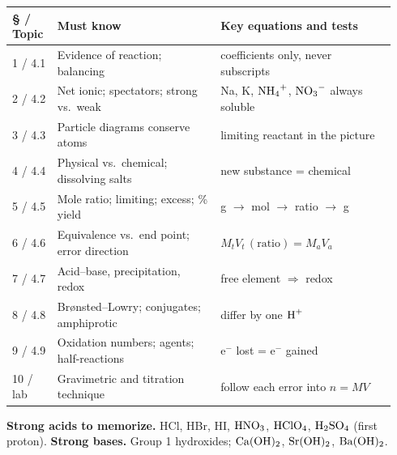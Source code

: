 \documentclass[11pt]{article}
\begin{document}
\begin{longtable}{@{}p{0.11\linewidth}p{0.40\linewidth}p{0.43\linewidth}@{}}\toprule
\S{} / Topic & Must know & Key equations and tests \\ \midrule
1 / 4.1 & Evidence of reaction; balancing & coefficients only, never subscripts \\[3pt]
2 / 4.2 & Net ionic; spectators; strong vs.\ weak & Na, K, $\ce{NH4+}$, $\ce{NO3-}$ always soluble \\[3pt]
3 / 4.3 & Particle diagrams conserve atoms & limiting reactant in the picture \\[3pt]
4 / 4.4 & Physical vs.\ chemical; dissolving salts & new substance = chemical \\[3pt]
5 / 4.5 & Mole ratio; limiting; excess; \% yield & g $\rightarrow$ mol $\rightarrow$ ratio $\rightarrow$ g \\[3pt]
6 / 4.6 & Equivalence vs.\ end point; error direction & $M_tV_t\,(\text{ratio}) = M_aV_a$ \\[3pt]
7 / 4.7 & Acid--base, precipitation, redox & free element $\Rightarrow$ redox \\[3pt]
8 / 4.8 & Brønsted--Lowry; conjugates; amphiprotic & differ by one $\ce{H+}$ \\[3pt]
9 / 4.9 & Oxidation numbers; agents; half-reactions & e$^-$ lost = e$^-$ gained \\[3pt]
10 / lab & Gravimetric and titration technique & follow each error into $n = MV$ \\ \bottomrule
\end{longtable}

\textbf{Strong acids to memorize.} HCl, HBr, HI, $\ce{HNO3}$, $\ce{HClO4}$, $\ce{H2SO4}$ (first proton). \textbf{Strong bases.} Group 1 hydroxides; $\ce{Ca(OH)2}$, $\ce{Sr(OH)2}$, $\ce{Ba(OH)2}$.
\end{document}
